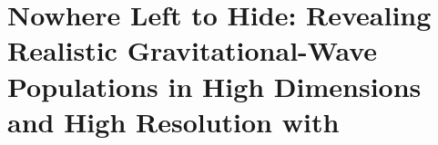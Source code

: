 \chapter{Nowhere Left to Hide: Revealing Realistic Gravitational-Wave Populations in High Dimensions and High Resolution with \PixelPop}
\begin{refsection}


\providecommand{\PixelPop}{\textsc{PixelPop}\xspace}
\providecommand{\PeakTukey}{\textsc{Peak + Tukey}\xspace}
\providecommand{\Hybrid}{\textsc{Hybrid}\xspace}
\providecommand{\chip}{\chi_\mathrm{p}}
\providecommand{\Ndet}{N_\mathrm{det}}
\providecommand{\rateunit}{\mathrm{Gpc^{-3}\,yr^{-1}}}
\providecommand{\relrate}{\Delta\mathcal{R}/\bar{\mathcal{R}}}
\providecommand{\pp}{\textsc{Power Law + Peak}\xspace}
\providecommand{\pr}{\textsc{Power Law}\xspace}
\providecommand{\Msun}{M_\odot}
\providecommand{\qone}{0.4}
\providecommand{\qtwo}{0.82}
\providecommand{\mpeak}{18.7}
\providecommand{\xeffone}{0}
\providecommand{\xefftwo}{0.25}
\providecommand{\zone}{0.2}
\providecommand{\ztwo}{0.8}
\providecommand{\qonetruezone}{6}
\providecommand{\qtwozone}{102}
\providecommand{\qonetrueztwo}{8}
\providecommand{\qtwotrueztwo}{143}
\providecommand{\mpeaktruezone}{26}
\providecommand{\mpeaktrueztwo}{39}
\providecommand{\xeffonetruezone}{285}
\providecommand{\xefftwotruezone}{16}
\providecommand{\xeffonetrueztwo}{388}
\providecommand{\xefftwotrueztwo}{39}


\end{refsection}
